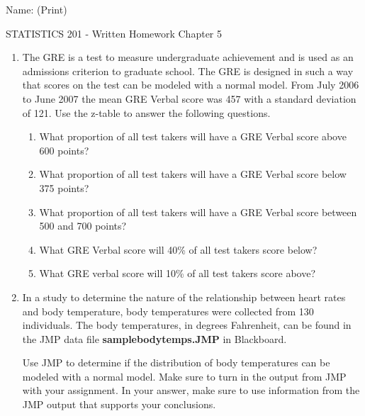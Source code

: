 \documentclass{article}
\begin{document}
\hspace{2in} Name: (Print) \underline{\mbox{\hspace{3.5in}}}\\

\begin{center}
{\large STATISTICS 201 - Written Homework Chapter 5}\\[3mm]
\end{center}

\begin{enumerate}

\item The GRE is a test to measure undergraduate achievement and is used as an admissions criterion to graduate school. The GRE is designed in such a way that scores on the test can be modeled with a normal model. From July 2006 to June 2007 the mean GRE Verbal score was 457 with a standard deviation of 121. Use the z-table to answer the following questions. 

\begin{enumerate}
\item What proportion of all test takers will have a GRE Verbal score above 600 points?\\[1in]
\item What proportion of all test takers will have a GRE Verbal score below 375 points?\\[1in]
\item What proportion of all test takers will have a GRE Verbal score between 500 and 700 points?\\[1in]
\item What GRE Verbal score will 40\% of all test takers score below?\\[1in]
\item What GRE verbal score will 10\% of all test takers score above?
\end{enumerate}

\newpage

\item In a study to determine the nature of the relationship between heart rates and body temperature, body temperatures were collected from 130 individuals. The body temperatures, in degrees Fahrenheit, can be found in the JMP data file {\bf samplebodytemps.JMP} in Blackboard.

Use JMP to determine if the distribution of body temperatures can be modeled with a normal model. Make sure to turn in the output from JMP with your assignment. In your answer, make sure to use information from the JMP output that supports your conclusions. 

\end{enumerate}
\end{document}
